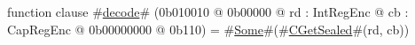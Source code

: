function clause #\hyperref[sailMIPSzdecode]{decode}# (0b010010 @ 0b00000 @ rd : IntRegEnc @ cb : CapRegEnc @ 0b00000000 @ 0b110) = #\hyperref[sailMIPSzSome]{Some}#(#\hyperref[sailMIPSzCGetSealed]{CGetSealed}#(rd, cb))
